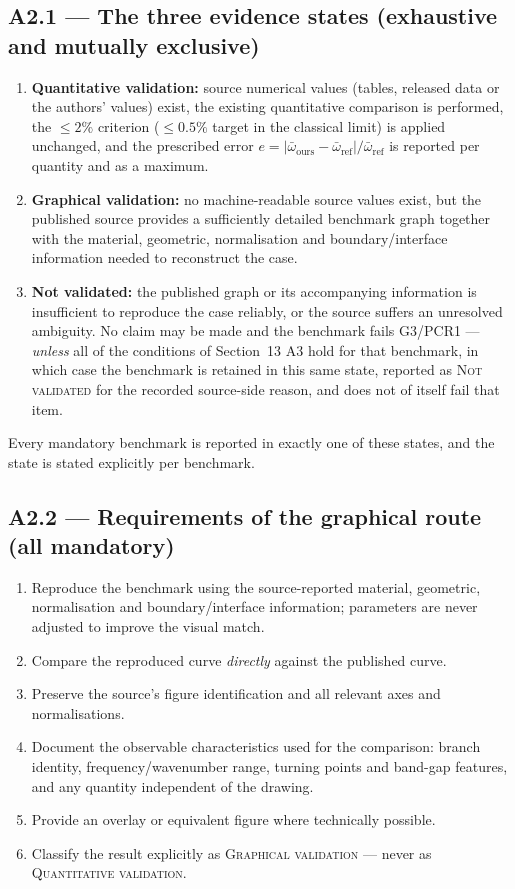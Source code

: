 \documentclass[11pt,a4paper]{article}
\begin{document}
\subsection*{A2.1 --- The three evidence states (exhaustive and mutually exclusive)}
\begin{enumerate}[label=\textbf{(\alph*)}]
\item \textbf{Quantitative validation:} source numerical values (tables, released data or the authors'
values) exist, the existing quantitative comparison is performed, the $\le 2\%$ criterion
($\le 0.5\%$ target in the classical limit) is applied unchanged, and the prescribed error
$e=|\bar\omega_{\mathrm{ours}}-\bar\omega_{\mathrm{ref}}|/\bar\omega_{\mathrm{ref}}$ is reported per
quantity and as a maximum.
\item \textbf{Graphical validation:} no machine-readable source values exist, but the published source
provides a sufficiently detailed benchmark graph together with the material, geometric, normalisation
and boundary/interface information needed to reconstruct the case.
\item \textbf{Not validated:} the published graph or its accompanying information is insufficient to
reproduce the case reliably, or the source suffers an unresolved ambiguity. No claim may be made and the
benchmark fails G3/PCR1 --- \emph{unless} all of the conditions of Section~13 A3 hold for that benchmark,
in which case the benchmark is retained in this same state, reported as \textsc{Not validated} for the
recorded source-side reason, and does not of itself fail that item.
\end{enumerate}
Every mandatory benchmark is reported in exactly one of these states, and the state is stated
explicitly per benchmark.

\subsection*{A2.2 --- Requirements of the graphical route (all mandatory)}
\begin{enumerate}[label=\textbf{G\arabic*.}]
\item Reproduce the benchmark using the source-reported material, geometric, normalisation and
boundary/interface information; parameters are never adjusted to improve the visual match.
\item Compare the reproduced curve \emph{directly} against the published curve.
\item Preserve the source's figure identification and all relevant axes and normalisations.
\item Document the observable characteristics used for the comparison: branch identity,
frequency/wavenumber range, turning points and band-gap features, and any quantity independent of the
drawing.
\item Provide an overlay or equivalent figure where technically possible.
\item Classify the result explicitly as \textsc{Graphical validation} --- never as
\textsc{Quantitative validation}.
\end{enumerate}
\end{document}
